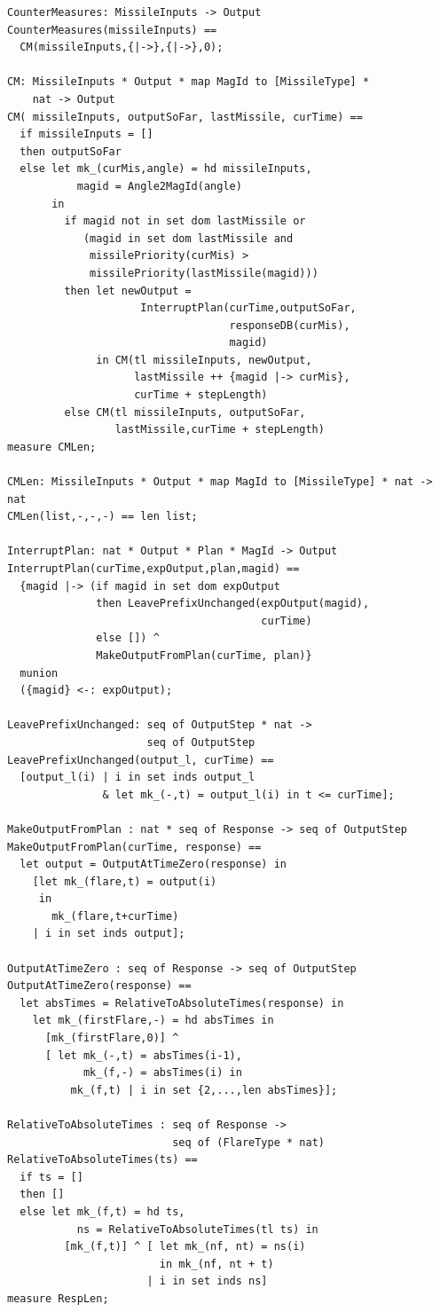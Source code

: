 \documentclass{overturerepchap}
\begin{document}
\begin{lstlisting}
CounterMeasures: MissileInputs -> Output
CounterMeasures(missileInputs) ==
  CM(missileInputs,{|->},{|->},0);

CM: MissileInputs * Output * map MagId to [MissileType] * 
    nat -> Output
CM( missileInputs, outputSoFar, lastMissile, curTime) ==
  if missileInputs = []
  then outputSoFar
  else let mk_(curMis,angle) = hd missileInputs,
           magid = Angle2MagId(angle)
       in
         if magid not in set dom lastMissile or
            (magid in set dom lastMissile and
             missilePriority(curMis) > 
             missilePriority(lastMissile(magid)))
         then let newOutput = 
                     InterruptPlan(curTime,outputSoFar,
                                   responseDB(curMis),
                                   magid)
              in CM(tl missileInputs, newOutput, 
                    lastMissile ++ {magid |-> curMis},
                    curTime + stepLength)
         else CM(tl missileInputs, outputSoFar, 
                 lastMissile,curTime + stepLength)
measure CMLen;

CMLen: MissileInputs * Output * map MagId to [MissileType] * nat -> nat
CMLen(list,-,-,-) == len list;

InterruptPlan: nat * Output * Plan * MagId -> Output
InterruptPlan(curTime,expOutput,plan,magid) ==
  {magid |-> (if magid in set dom expOutput
              then LeavePrefixUnchanged(expOutput(magid), 
                                        curTime)
              else []) ^
              MakeOutputFromPlan(curTime, plan)} 
  munion
  ({magid} <-: expOutput);

LeavePrefixUnchanged: seq of OutputStep * nat -> 
                      seq of OutputStep
LeavePrefixUnchanged(output_l, curTime) ==
  [output_l(i) | i in set inds output_l
               & let mk_(-,t) = output_l(i) in t <= curTime];

MakeOutputFromPlan : nat * seq of Response -> seq of OutputStep
MakeOutputFromPlan(curTime, response) ==
  let output = OutputAtTimeZero(response) in
    [let mk_(flare,t) = output(i)
     in
       mk_(flare,t+curTime)
    | i in set inds output];

OutputAtTimeZero : seq of Response -> seq of OutputStep
OutputAtTimeZero(response) ==
  let absTimes = RelativeToAbsoluteTimes(response) in
    let mk_(firstFlare,-) = hd absTimes in
      [mk_(firstFlare,0)] ^
      [ let mk_(-,t) = absTimes(i-1),
            mk_(f,-) = absTimes(i) in
          mk_(f,t) | i in set {2,...,len absTimes}];

RelativeToAbsoluteTimes : seq of Response -> 
                          seq of (FlareType * nat)
RelativeToAbsoluteTimes(ts) ==
  if ts = []
  then []
  else let mk_(f,t) = hd ts,
           ns = RelativeToAbsoluteTimes(tl ts) in
         [mk_(f,t)] ^ [ let mk_(nf, nt) = ns(i)
                        in mk_(nf, nt + t)
                      | i in set inds ns]
measure RespLen;


\end{lstlisting}
\end{document}
